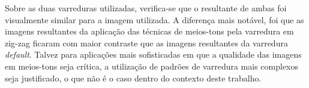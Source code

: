 \documentclass{article}
\begin{document}
Sobre as duas varreduras utilizadas, verifica-se que o resultante de ambas foi visualmente similar para a imagem utilizada. A diferença mais notável, foi que as imagens resultantes da aplicação das técnicas de meios-tons pela varredura em zig-zag ficaram com maior contraste que as imagens resultantes da varredura \textit{default}. Talvez para aplicações mais sofisticadas em que a qualidade das imagens em meios-tons seja crítica, a utilização de padrões de varredura mais complexos seja justificado, o que não é o caso dentro do contexto deste trabalho.

\end{document}
